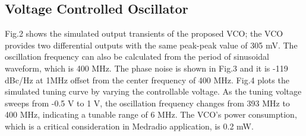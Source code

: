 \subsection{Voltage Controlled Oscillator}
Fig.2 shows the simulated output transients of the proposed VCO; the VCO provides two differential outputs with the same peak-peak value of 305 mV. The oscillation frequency can also be calculated from the period of sinusoidal waveform, which is 400 MHz. The phase noise is shown in Fig.3 and it is -119 dBc/Hz at 1MHz offset from the center frequency of 400 MHz. Fig.4 plots the simulated tuning curve by varying the controllable voltage. As the tuning voltage sweeps from -0.5 V to 1 V, the oscillation frequency changes from 393 MHz to 400 MHz, indicating a tunable range of 6 MHz. The VCO’s power consumption, which is a critical consideration in Medradio application, is 0.2 mW.